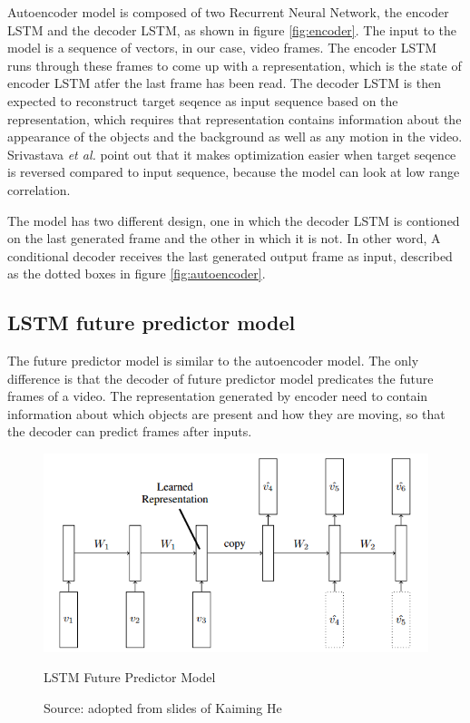 \documentclass[twoside,a4paper,article]{combine}
\begin{document}
Autoencoder model is composed of two Recurrent Neural Network, the encoder LSTM and the decoder LSTM, as shown in figure \ref{fig:encoder}.
The input to the model is a sequence of vectors, in our case, video frames. The encoder LSTM runs through these frames to come up with a
representation, which is the state of encoder LSTM atfer the last frame has been read. The decoder LSTM is then expected to reconstruct
target seqence as input sequence based on the representation, which requires that representation contains information about the
appearance of the objects and the background as well as any motion in the video. Srivastava \emph{et al.} point out that it makes
optimization easier when target seqence is reversed compared to input sequence, because the model can look at low range correlation. 

The model has two different design, one in which the decoder LSTM is contioned on the last generated frame and the other in which it is
not. In other word, A conditional decoder receives the last generated output frame as input, described as the dotted boxes in figure 
\ref{fig:autoencoder}.

\subsection{LSTM future predictor model}
The future predictor model is similar to the autoencoder model. The only difference is that the decoder of future predictor model
predicates the future frames of a video. The representation generated by encoder need to contain information about which objects are 
present and how they are moving, so that the decoder can predict frames after inputs.

\begin{figure}[ht!]
    \includegraphics[width=\linewidth]{predictor}
    \caption{LSTM Future Predictor Model}
    \caption*{Source: adopted from slides of Kaiming He}
    \label{fig:predictor}
\end{figure}
\end{document}
